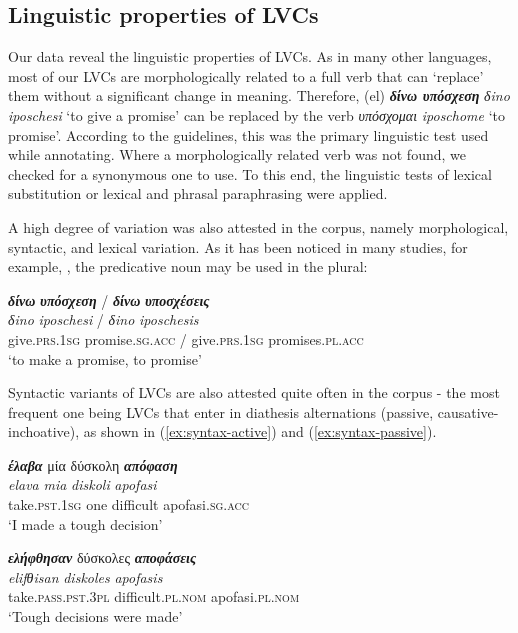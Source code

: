 \documentclass[output=paper,colorlinks,citecolor=brown]{langscibook}
\begin{document}
\subsection{Linguistic properties of LVCs}
Our data reveal the linguistic properties of LVCs. As in many other languages, most of our LVCs are morphologically related to a full verb that can ‘replace’ them without a significant change in meaning. Therefore, (el) \textbf{\em{δίνω υπόσχεση}} \textit{δino iposchesi} `to give a promise' can be replaced by the verb \textit{υπόσχομαι} \textit{iposchome} `to promise'. According to the guidelines, this was the primary linguistic test used while annotating. Where a morphologically related verb was not found, we checked for a synonymous one to use. To this end, the linguistic tests of lexical substitution or lexical and phrasal paraphrasing were applied.


A high degree of variation was also attested in the corpus, namely morphological, syntactic, and lexical variation. As it has been noticed in many studies, for example, \citep{Butt2010}, the predicative noun may be used in the plural:

\ea
 \label{ex:morpho-dino-iposchesi}
 \settowidth {}
 \glll
 \textbf{\em{δίνω}} \textbf{\em{υπόσχεση}} / \textbf{\em{δίνω}} \textbf{\em{υποσχέσεις}}\\ 
\textit{δino} \textit{iposchesi} / \textit{δino} \textit{iposchesis} \\
give.\textsc{prs.1sg} promise.\textsc{sg.acc} / give.\textsc{prs.1sg} promises.\textsc{pl.acc} \\
\glt `to make a promise, to promise' \\
\z

Syntactic variants of LVCs are also attested quite often in the corpus - the most frequent one being LVCs that enter in diathesis alternations (passive, causative-inchoative), as shown in (\ref{ex:syntax-active}) and (\ref{ex:syntax-passive}).

\ea
 \label{ex:syntax-active}
 \settowidth {}
 \glll
 \textbf{\em{έλαβα}} μία  δύσκολη \textbf{\em{απόφαση}} \\ 
\textit{elava} \textit{mia} \textit{diskoli} \textit{apofasi} \\
take.\textsc{pst.1sg} one difficult apofasi.\textsc{sg.acc} \\
\glt `I made a tough decision' \\
\z


\ea
 \label{ex:syntax-passive}
 \settowidth {}
 \glll
 \textbf{\em{ελήφθησαν}}  δύσκολες \textbf{\em{αποφάσεις}} \\ 
\textit{elifθisan} \textit{diskoles} \textit{apofasis} \\
take.\textsc{pass.pst.3pl} difficult.\textsc{pl.nom} apofasi.\textsc{pl.nom} \\
\glt `Tough decisions were made' \\
\z
\end{document}
